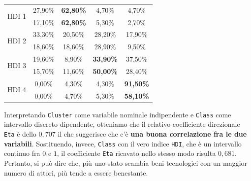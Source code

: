 \documentclass[]{article}
\begin{document}
\begin{multicols}{2}
\begin{table}[H]
\begin{tabular}{@{}ccccc@{}}
			\multirow{2}{*}{HDI 1} & 27,90\% & \textbf{62,80\%} & 4,70\% & 4,70\% \\
			& 17,10\% & \textbf{62,80\%} & 5,30\% & 2,70\% \\ \midrule
			\multirow{2}{*}{HDI 2} & 33,30\% & 20,50\% & 28,20\% & 17,90\% \\
			& 18,60\% & 18,60\% & 28,90\% & 9,50\% \\ \midrule
			\multirow{2}{*}{HDI 3} & 19,60\% & 8,90\% & \textbf{33,90\%} & 37,50\% \\
			& 15,70\% & 11,60\% & \textbf{50,00\%} & 28,40\% \\ \midrule
			\multirow{2}{*}{HDI 4} & 0,00\% & 4,30\% & 4,30\% & \textbf{91,50\%} \\
			& 0,00\% & 4,70\% & 5,30\% & \textbf{58,10\%} \\ \bottomrule
		\end{tabular}
	\end{table}
	Interpretando \texttt{Cluster} come variabile nominale indipendente e \texttt{Class} come intervallo discreto dipendente, otteniamo che il relativo coefficiente direzionale \texttt{Eta} è dello $0,707$ il che suggerisce che c'è \textbf{una buona correlazione fra le due variabili}. Sostituendo, invece, \texttt{Class} con il vero indice \texttt{HDI}, che è un intervallo continuo fra $0$ e $1$, il coefficiente \texttt{Eta} ricavato nello stesso modo risulta $0,681$. Pertanto, si può dire che, più uno stato scambia beni tecnologici con un maggior numero di attori, più tende a essere benestante.
	

\end{multicols}
\end{document}
